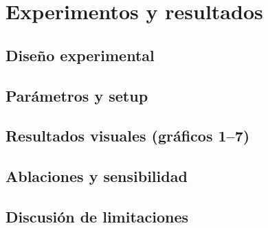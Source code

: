 \section{Experimentos y resultados}\label{sec:resultados}

\subsection{Diseño experimental}\label{subsec:exp-diseno}

\subsection{Parámetros y setup}\label{subsec:exp-setup}

\subsection{Resultados visuales (gráficos 1–7)}\label{subsec:exp-graficos}

\subsection{Ablaciones y sensibilidad}\label{subsec:exp-ablaciones}

\subsection{Discusión de limitaciones}\label{subsec:exp-limitaciones}
